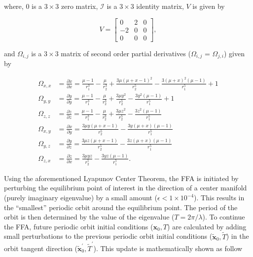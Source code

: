 \documentclass[11pt]{article} %
\begin{document}
\noindent
where, $0$ is a $3\times3$ zero matrix, $\mathcal{I}$ is a $3\times3$ identity matrix, $V$ is given by

\begin{equation}
	V = \begin{bmatrix}
		0 & 2 & 0 \\
		-2 & 0 & 0 \\
		0 & 0 & 0
	\end{bmatrix},
\end{equation}

\noindent
and $\Omega_{i,j}$ is a $3\times3$ matrix of second order partial derivatives ($\Omega_{i,j}$ = $\Omega_{j,i}$) given by

\begin{align}
	\Omega_{x,x} &= \frac{\partial\ddot{x}}{\partial x} = \frac{\mu - 1}{r_1^3} - \frac{\mu}{r_2^3} + \frac{3\mu\left(\mu+x-1\right)^2}{r_2^5} - \frac{3\left(\mu+x\right)^2\left(\mu-1\right)}{r_1^5} + 1 \\
	\Omega_{y,y} &= \frac{\partial\ddot{y}}{\partial y} = \frac{\mu - 1}{r_1^3} - \frac{\mu}{r_2^3} + \frac{3\mu y^2}{r_2^5} - \frac{3y^2\left(\mu-1\right)}{r_1^5} + 1 \\
	\Omega_{z,z} &= \frac{\partial\ddot{z}}{\partial z} = \frac{\mu - 1}{r_1^3} - \frac{\mu}{r_2^3} + \frac{3\mu z^2}{r_2^5} - \frac{3z^2\left(\mu-1\right)}{r_1^5} \\
	\Omega_{x,y} &= \frac{\partial\ddot{x}}{\partial y} = \frac{3\mu y\left(\mu+x-1\right)}{r_2^5} - \frac{3y\left(\mu+x\right)\left(\mu-1\right)}{r_1^5} \\
	\Omega_{y,z} &= \frac{\partial\ddot{y}}{\partial z} = \frac{3\mu z\left(\mu+x-1\right)}{r_2^5} - \frac{3z\left(\mu+x\right)\left(\mu-1\right)}{r_1^5}\\
	\Omega_{z,x} &= \frac{\partial\ddot{z}}{\partial x} = \frac{3\mu yz}{r_2^5} - \frac{3yz\left(\mu-1\right)}{r_1^5}.
\end{align}

\noindent
Using the aforementioned Lyapunov Center Theorem, the FFA is initiated by perturbing the equilibrium point of interest in the direction of a center manifold (purely imaginary eigenvalue) by a small amount ($\epsilon < 1\times10^{-4}$). This results in the ``smallest'' periodic orbit around the equilibrium point. The period of the orbit is then determined by the value of the eigenvalue ($T=2\pi/\lambda$). To continue the FFA, future periodic orbit initial conditions ($\bm{x}_0, T$) are calculated by adding small perturbations to the previous periodic orbit initial conditions ($\tilde{\bm{x}}_0, \tilde{T}$) in the orbit tangent direction ($\tilde{\bm{x}}_0^{\prime}, \tilde{T}^{\prime}$). This update is mathematically shown as follow
\end{document}

